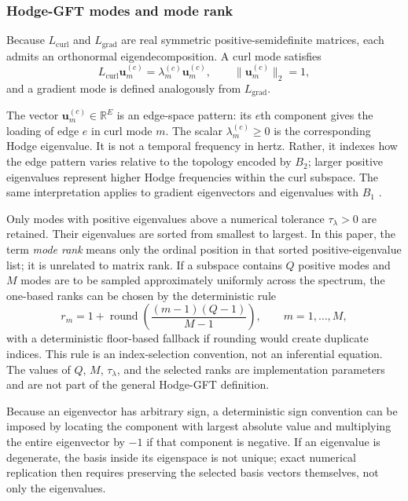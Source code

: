 \documentclass[12pt]{article}
\newcommand{\R}{\mathbb{R}}
\begin{document}
\subsubsection{Hodge-GFT modes and mode rank}
Because $L_{\mathrm{curl}}$ and $L_{\mathrm{grad}}$ are real symmetric positive-semidefinite matrices, each admits an orthonormal eigendecomposition. A curl mode satisfies
\begin{equation}
L_{\mathrm{curl}}\bm u_m^{(c)}=\lambda_m^{(c)}\bm u_m^{(c)},
\qquad \|\bm u_m^{(c)}\|_2=1,
\label{eq:eigencurl}
\end{equation}
and a gradient mode is defined analogously from $L_{\mathrm{grad}}$.

The vector $\bm u_m^{(c)}\in\R^E$ is an edge-space pattern: its $e$th component gives the loading of edge $e$ in curl mode $m$. The scalar $\lambda_m^{(c)}\ge0$ is the corresponding Hodge eigenvalue. It is not a temporal frequency in hertz. Rather, it indexes how the edge pattern varies relative to the topology encoded by $B_2$; larger positive eigenvalues represent higher Hodge frequencies within the curl subspace. The same interpretation applies to gradient eigenvectors and eigenvalues with $B_1$ \citep{BarbarossaSardellitti2020,Schaub2021}.

Only modes with positive eigenvalues above a numerical tolerance $\tau_\lambda>0$ are retained. Their eigenvalues are sorted from smallest to largest. In this paper, the term \emph{mode rank} means only the ordinal position in that sorted positive-eigenvalue list; it is unrelated to matrix rank. If a subspace contains $Q$ positive modes and $M$ modes are to be sampled approximately uniformly across the spectrum, the one-based ranks can be chosen by the deterministic rule
\[
r_m=1+\operatorname{round}\!\left(\frac{(m-1)(Q-1)}{M-1}\right),\qquad m=1,\ldots,M,
\]
with a deterministic floor-based fallback if rounding would create duplicate indices. This rule is an index-selection convention, not an inferential equation. The values of $Q$, $M$, $\tau_\lambda$, and the selected ranks are implementation parameters and are not part of the general Hodge-GFT definition.

Because an eigenvector has arbitrary sign, a deterministic sign convention can be imposed by locating the component with largest absolute value and multiplying the entire eigenvector by $-1$ if that component is negative. If an eigenvalue is degenerate, the basis inside its eigenspace is not unique; exact numerical replication then requires preserving the selected basis vectors themselves, not only the eigenvalues.
\end{document}

